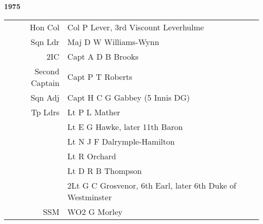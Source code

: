 \begin{center}
  \Huge
  \textbf{1975}
\end{center}

\begin{center}
  \small
  \begin{tabular}{rl}
    Hon Col & Col P Lever, 3rd Viscount Leverhulme \\
    Sqn Ldr & Maj D W Williams-Wynn \\
    2IC & Capt A D B Brooks \\
    Second Captain & Capt P T Roberts \\
    Sqn Adj & Capt H C G Gabbey (5 Innis DG) \\
    Tp Ldrs & Lt P L Mather \\
      & Lt E G Hawke, later 11th Baron \\
      & Lt N J F Dalrymple-Hamilton \\
      & Lt R Orchard \\
      & Lt D R B Thompson \\
      & 2Lt G C Grosvenor, 6th Earl, later 6th Duke of Westminster \\
    SSM & WO2 G Morley \\
  \end{tabular}
\end{center}

